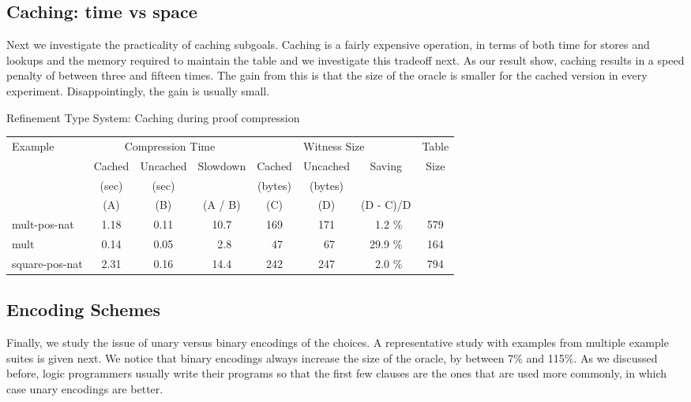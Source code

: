 \documentclass{llncs}
\begin{document}
\subsection{Caching: time vs space}
Next we investigate the practicality of caching subgoals. Caching is a
fairly expensive operation, in terms of both time for stores and
lookups and the memory required to maintain the table and we
investigate this tradeoff next. As our result show, caching results in
a speed penalty of between three and fifteen times. The gain from this
is that the size of the oracle is smaller for the cached version in
every experiment. Disappointingly, the gain is usually small.

\begin{center}
Refinement Type System: Caching during proof compression
\begin{small}
\begin{tabular}{|l|c|c|c|c|c|c|c|}
\hline
Example & \multicolumn{3}{c}{Compression Time} & 
\multicolumn{3}{c}{Witness Size} & Table\\
& Cached & Uncached & Slowdown & Cached & Uncached & Saving & Size\\
& (sec) & (sec) &  & (bytes) & (bytes) & & \\
& (A) & (B) & (A / B) & (C) & (D) & (D - C)/D &\\
\hline
mult-pos-nat & 1.18 & 0.11 & 10.7 & 169 & 171 & \ 1.2 \% & 579\\
mult & 0.14 & 0.05 & \ 2.8 & \ 47 & \ 67 & 29.9 \% & 164\\
square-pos-nat & 2.31 & 0.16 & 14.4 & 242 & 247 & \ 2.0 \% & 794\\
\hline
\end{tabular}
\end{small}
\end{center}

\subsection{Encoding Schemes}
Finally, we study the issue of unary versus binary encodings of the choices.
A representative study with examples from multiple example suites is given
next. %
 We notice that binary encodings always 
increase the size of the oracle, by between 7\% and 115\%. As we discussed
before, logic programmers usually write their programs so that the first
few clauses are the ones that are used more commonly, in which case unary 
encodings are better.
\end{document}
